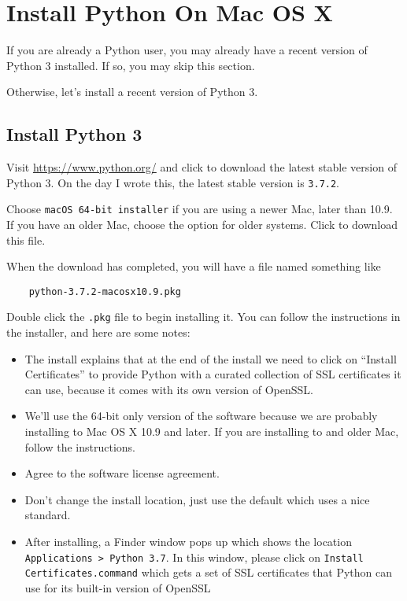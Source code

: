 \chapter{Install Python On Mac OS X}
\hypertarget{macosx-install-python}{}

If you are already a Python user, you may already have a recent
version of Python 3 installed. If so, you may skip this section.

Otherwise, let's install a recent version of Python 3.

\section{Install Python 3}


Visit \url{https://www.python.org/} and click to download the latest stable version
of Python 3. On the day I wrote this, the latest stable version
is \texttt{3.7.2}.

Choose \texttt{macOS 64-bit installer} if you are using a newer
Mac, later than 10.9. If you have an older Mac, choose the option
for older systems. Click to download this file.

When the download has completed, you will have a file named something like

\begin{verbatim}
    python-3.7.2-macosx10.9.pkg
\end{verbatim}

Double click the \texttt{.pkg} file to begin installing it. You can
follow the instructions in the installer, and here are some notes:

\begin{itemize}

\item The install explains that at the end of the install we need
  to click on ``Install Certificates'' to provide Python with a
  curated collection of SSL certificates it can use, because it comes
  with its own version of OpenSSL.

\item We'll use the 64-bit only version of the software because
  we are probably installing to Mac OS X 10.9 and later. If you are
  installing to and older Mac, follow the instructions.

\item Agree to the software license agreement.

\item Don't change the install location, just use the default which
  uses a nice standard.

\item After installing, a Finder window pops up which shows the
  location \texttt{Applications > Python 3.7}. In this window, please
  click on \texttt{Install Certificates.command} which gets a set of
  SSL certificates that Python can use for its built-in version
  of OpenSSL

\end{itemize}

